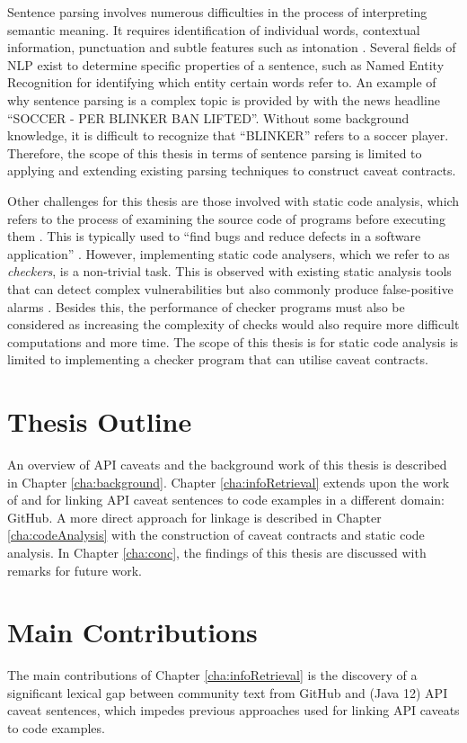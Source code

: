 Sentence parsing involves numerous difficulties in the process of interpreting semantic meaning. It requires identification of individual words, contextual information, punctuation and subtle features such as intonation \cite{mitchell1994sentence}. Several fields of NLP exist to determine specific properties of a sentence, such as Named Entity Recognition for identifying which entity certain words refer to. An example of why sentence parsing is a complex topic is provided by \cite{ratinov-roth-2009-design} with the news headline ``SOCCER - PER BLINKER BAN LIFTED''. Without some background knowledge, it is difficult to recognize that ``BLINKER'' refers to a soccer player.  Therefore, the scope of this thesis in terms of sentence parsing is limited to applying and extending existing parsing techniques to construct caveat contracts. \bigbreak

Other challenges for this thesis are those involved with static code analysis, which refers to the process of examining the source code of programs before executing them \cite{baca2009static}. This is typically used to ``find bugs and reduce defects in a software application'' \cite{bardas2010static}. However, implementing static code analysers, which we refer to as \textit{checkers}, is a non-trivial task. This is observed with existing static analysis tools that can detect complex vulnerabilities but also commonly produce false-positive alarms \cite{zitser2004testing}. Besides this, the performance of checker programs must also be considered as increasing the complexity of checks would also require more difficult computations and more time. The scope of this thesis is for static code analysis is limited to implementing a checker program that can utilise caveat contracts. 

\section{Thesis Outline}
\label{sec:outline}
An overview of API caveats and the background work of this thesis is described in Chapter \ref{cha:background}. Chapter \ref{cha:infoRetrieval} extends upon the work of \cite{jiamou} and \cite{xiaoxue} for linking API caveat sentences to code examples in a different domain: GitHub. A more direct approach for linkage is described in Chapter \ref{cha:codeAnalysis} with the construction of caveat contracts and static code analysis. In Chapter \ref{cha:conc}, the findings of this thesis are discussed with remarks for future work.

\section{Main Contributions}
The main contributions of Chapter \ref{cha:infoRetrieval} is the discovery of a significant lexical gap between community text from GitHub and (Java 12) API caveat sentences, which impedes previous approaches used for linking API caveats to code examples.\\


